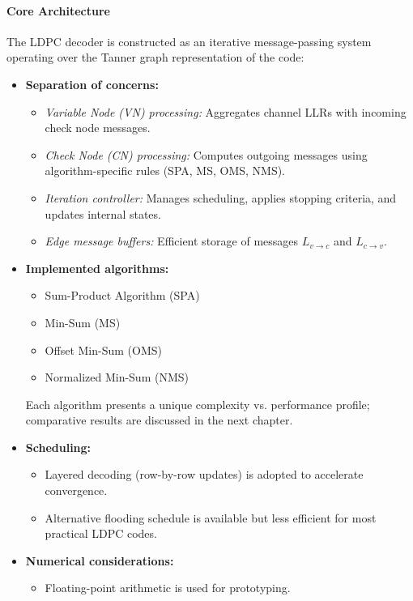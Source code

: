 \documentclass[../main.tex]{subfiles}
\begin{document}
\paragraph{Core Architecture}
The LDPC decoder is constructed as an iterative message-passing system operating over the Tanner graph representation of the code:
\begin{itemize}
    \item \textbf{Separation of concerns:}
        \begin{itemize}
            \item \emph{Variable Node (VN) processing:} Aggregates channel LLRs with incoming check node messages.
            \item \emph{Check Node (CN) processing:} Computes outgoing messages using algorithm-specific rules (SPA, MS, OMS, NMS).
            \item \emph{Iteration controller:} Manages scheduling, applies stopping criteria, and updates internal states.
            \item \emph{Edge message buffers:} Efficient storage of messages $L_{v \to c}$ and $L_{c \to v}$.
        \end{itemize}
    \item \textbf{Implemented algorithms:}
        \begin{itemize}
            \item Sum-Product Algorithm (SPA)
            \item Min-Sum (MS)
            \item Offset Min-Sum (OMS)
            \item Normalized Min-Sum (NMS)
        \end{itemize}
        Each algorithm presents a unique complexity vs. performance profile; comparative results are discussed in the next chapter.
    \item \textbf{Scheduling:}
        \begin{itemize}
            \item Layered decoding (row-by-row updates) is adopted to accelerate convergence.
            \item Alternative flooding schedule is available but less efficient for most practical LDPC codes.
        \end{itemize}
    \item \textbf{Numerical considerations:}
        \begin{itemize}
            \item Floating-point arithmetic is used for prototyping.

\end{itemize}
\end{itemize}
\end{document}
